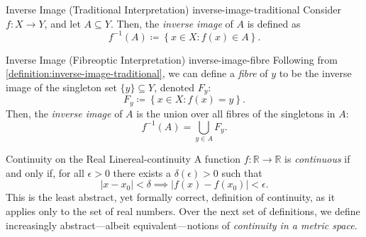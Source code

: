 \documentclass{article}
\numberwithin{equation}{section}
\numberwithin{figure}{section}
\begin{document}
\begin{definition}{Inverse Image (Traditional Interpretation)}
        {inverse-image-traditional}
    Consider $ f \colon X \to Y $, and let $ A \subseteq Y $. Then, the
    \emph{inverse image} of $ A $ is defined as
    \begin{equation}
        f^{-1}{(A)} \coloneq \left\{ x \in X \colon f(x) \in A \right\}.
    \end{equation}
\end{definition}
\begin{definition}{Inverse Image (Fibreoptic Interpretation)}
        {inverse-image-fibre}
    Following from \cref{definition:inverse-image-traditional}, we can define a
    \emph{fibre} of $ y $ to be the inverse image of the singleton set $ \{ y \}
    \subseteq Y $, denoted $ F_y $:
    \begin{equation}
        F_y \coloneq \left\{ x \in X \colon f(x) = y \right\}.
    \end{equation}
    Then, the \emph{inverse image} of $ A $ is the union over all fibres of the
    singletons in $ A $:
    \begin{equation}
        f^{-1}{(A)} = \bigcup_{y \in A} F_y.
    \end{equation}
\end{definition}
\begin{definition}{Continuity on the Real Line}{real-continuity}
    A function $ f \colon \mathbb{R} \to \mathbb{R} $ is \emph{continuous} if
    and only if, for all $ \epsilon > 0 $ there exists a $ \delta{(\epsilon)} >
    0 $ such that
    \begin{equation}
        \left\vert x - x_0 \right\vert < \delta \implies \left\vert f{(x)} -
        f{\left(x_0\right)} \right\vert < \epsilon.
    \end{equation}
    This is the least abstract, yet formally correct, definition of continuity,
    as it applies only to the set of real numbers. Over the next set of
    definitions, we define increasingly abstract---albeit equivalent---notions
    of \emph{continuity in a metric space}.
\end{definition}
\end{document}
